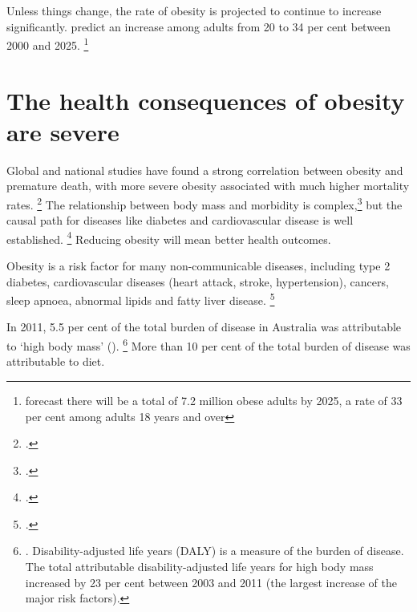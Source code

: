 \documentclass[embargoed]{grattan}
\begin{document}
Unless things change, the rate of obesity is projected to continue to increase significantly. \textcite{Walls2012Projectedprogressionprevalence} predict an increase among adults from 20 to 34 per cent between 2000 and 2025.%
\footnote{\textcite{PwC2015Weighingcostobesity} forecast there will be a total of 7.2 million obese adults by 2025, a rate of 33 per cent among adults 18 years and over}

\section{The health consequences of obesity are severe}\label{the-health-consequences-of-obesity-are-severe}

Global and national studies have found a strong correlation between obesity and premature death, with more severe obesity associated with much higher mortality rates.%
\footcites{Collaboration2016Bodymassindex}{Aune2016BMIallcause}{Flegal2013Associationallcause}{Korda2013Prospectivecohortstudy} The relationship between body mass and morbidity is complex,\footcites{Swinburn2004Dietnutritionprevention}{Livingston2012Progressobesityresearch} but the causal path for diseases like diabetes and cardiovascular disease is well established.%
\footcites{Poirier2006Obesitycardiovasculardisease}{Kritchevsky2015Intentionalweightloss}{Rueda-Clausen2015Healthbenefitslong}{Blackburn1995Effectdegreeweight} Reducing obesity will mean better health outcomes.



Obesity is a risk factor for many non-communicable diseases, including type 2 diabetes, cardiovascular diseases (heart attack, stroke, hypertension), cancers, sleep apnoea, abnormal lipids and fatty liver disease.%
\footcites[][39--40]{Organisation2000Dietnutritionprevention}{Must1999diseaseburdenassociated}{Collaboration2016Bodymassindex}{Nordstroem2016RisksMyocardialInfarction} 

In 2011, 5.5 per cent of the total burden of disease in Australia was attributable to `high body mass' ().%
\footnote{\textcite[][Table 6.1]{Health2016AustralianBurdenDisease}.
Disability-adjusted life years (DALY) is a measure of the burden of disease.
The total attributable disability-adjusted life years for high body mass increased by 23 per cent between 2003 and 2011 (the largest increase of the major risk factors).} More than 10 per cent of the total burden of disease was attributable to diet.
\end{document}
